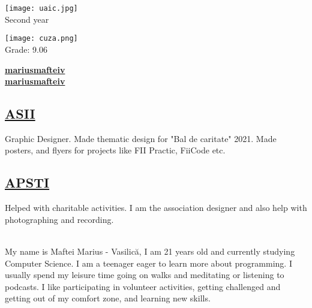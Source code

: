 \documentclass[a4paper]{MagicalCV}
\begin{document}
\lastupdated


\hfill \break





\begin{minipage}[t]{0.38\textwidth} 



\texttt{[image: uaic.jpg]} 
 \\
\vspace{\topsep} %
Second year
\sectionsep

\texttt{[image: cuza.png]} 
\\ 
\vspace{\topsep} %
Grade: 9.06
\sectionsep


 \href{https://github.com/mariusmafteiv}{\bf mariusmafteiv} \\
 \href{https://www.linkedin.com/in/mariusmafteiv/}{\bf mariusmafteiv}
\sectionsep

\subsection{\href{https://www.asii.ro/}{ASII}}
Graphic Designer.
Made thematic design for "Bal de caritate" 2021.
Made posters, and flyers for projects like FII Practic, FiiCode etc.
\sectionsep

\subsection{\href{https://www.facebook.com/AsociatiaPSTI}{APSTI}}
Helped with charitable activities. I am the association designer and also help with photographing and recording.
\sectionsep

\\
My name is Maftei Marius - Vasilică, I am 21 years old and currently studying Computer Science. I am a teenager eager to learn more about programming. I usually spend my leisure time going on walks and meditating or listening to podcasts. I like participating in volunteer activities, getting challenged and getting out of my comfort zone, and learning new skills.

\end{minipage} 
\end{document}
